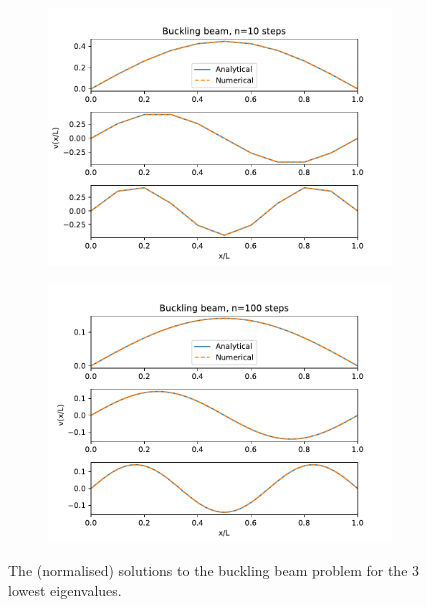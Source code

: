 \documentclass[english,notitlepage]{revtex4-2}  %
\begin{document}
\begin{figure}[h]
	\centering
	\begin{subfigure}[b]{0.95\textwidth}
		\includegraphics[scale=1]{imgs2/output_10.pdf}	
	\end{subfigure}
	\begin{subfigure}[b]{0.95\textwidth}
		\includegraphics[scale=1]{imgs2/output_100.pdf}	
	\end{subfigure}	
	\caption{The (normalised) solutions to the buckling beam problem for the 3 lowest eigenvalues.}
	\label{fig:1}
\end{figure}

	
\end{document}
